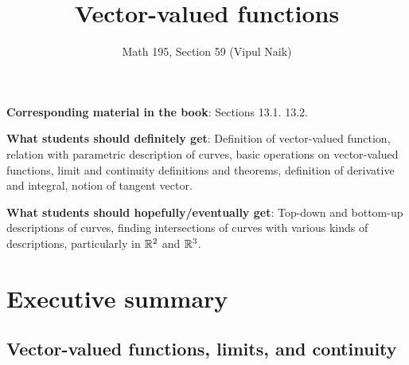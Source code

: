 \documentclass[10pt]{amsart}
\title{Vector-valued functions}
\author{Math 195, Section 59 (Vipul Naik)}
\begin{document}
\maketitle

{\bf Corresponding material in the book}: Sections 13.1. 13.2.

{\bf What students should definitely get}: Definition of vector-valued
function, relation with parametric description of curves, basic
operations on vector-valued functions, limit and continuity
definitions and theorems, definition of derivative and integral,
notion of tangent vector.

{\bf What students should hopefully/eventually get}: Top-down and
bottom-up descriptions of curves, finding intersections of curves with
various kinds of descriptions, particularly in $\mathbb{R}^2$ and $\mathbb{R}^3$.

\section*{Executive summary}

\subsection{Vector-valued functions, limits, and continuity}
\end{document}
